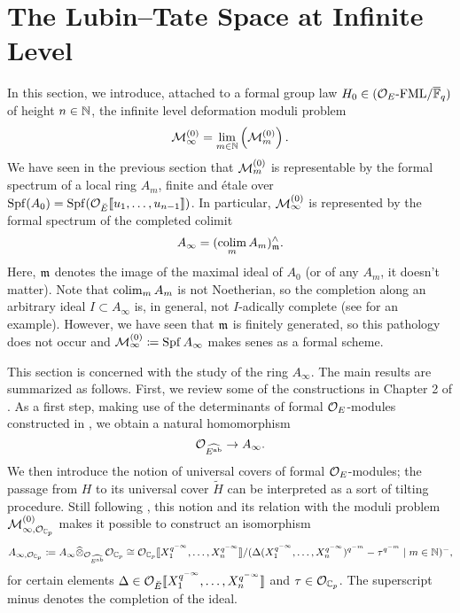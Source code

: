 \documentclass[../main.tex]{subfiles}
\begin{document}
\section{The Lubin--Tate Space at Infinite Level}
In this section, we introduce, attached to a formal group law
$H_0 \in {({\mathcal{O}_E}\text-\allowbreak\mathrm{FML}/{{\overline{\mathbb{F}}_q}})}$ of height $n \in \mathbb{N}$, the infinite level
deformation moduli problem
\begin{equation*}
  \mathcal{M}_{\infty}^{(0)} = \lim_{m \in \mathbb{N}} \left(\mathcal{M}_{m}^{(0)}\right).
\end{equation*}
We have seen in the previous section that $\mathcal{M}_{m}^{(0)}$ is 
representable by the formal spectrum of a local ring $A_m$, finite and \'etale
over $\operatorname{Spf}(A_0) = \operatorname{Spf}(\mathcal{O}_{{\breve {E}}}\llbracket u_1, \dots, u_{n-1}\rrbracket)$. In particular,
$\mathcal{M}_{\infty}^{(0)}$ is represented by 
the formal spectrum of the completed colimit 
\begin{equation*}
  A_\infty = (\operatorname*{colim}_m A_m)^\wedge_{\mathfrak{m}}.
\end{equation*}
Here, $\mathfrak{m}$ denotes the image of the maximal ideal of $A_0$ (or of any $A_m$, it doesn't
matter). Note that $\operatorname*{colim}_m A_m$ is not Noetherian, so the completion 
along an arbitrary ideal $I \subset A_\infty$ is, in general, not $I$-adically
complete (see \cite[\href{https://stacks.math.columbia.edu/tag/05JA}{Tag
05JA}]{stacks-project} for an example). However, we have seen that $\mathfrak{m}$ is
finitely generated, so this pathology does not occur and $\mathcal{M}_\infty^{(0)}
\coloneqq \operatorname{Spf} A_\infty$ makes senes as a formal scheme.

This section is concerned with the study of the ring $A_\infty$. 
The main results are summarized as follows. 
First, we review some of the constructions in Chapter 2 of
\cite{weinstein2016semistable}. As a first step, making use of the determinants
of formal $\mathcal{O}_E$-modules constructed in \cite{hedayatzadeh2015det}, we obtain
a natural homomorphism
\begin{equation*}
   \mathcal{O}_{\widehat{E^{\mathrm{ab}}}} \to  A_\infty.
\end{equation*}
We then introduce the notion of universal covers of formal $\mathcal{O}_E$-modules; the 
passage from $H$ to its universal cover $\tilde H$ can be interpreted as a sort
of tilting procedure. Still following \cite{weinstein2016semistable}, this
notion and its relation with the moduli problem $\mathcal{M}_{\infty,
\mathcal{O}_{\mathbb{C}_p}}^{(0)}$ makes it possible to construct an isomorphism
\begin{equation}\label{eq:ExplicitAinftyBCtoOC}
  A_{\infty, \mathcal{O}_{\mathbb{C}_p}} \coloneq A_\infty \widehat \otimes_{\mathcal{O}_{\widehat{E^{\mathrm{ab}}}}}
  \mathcal{O}_{\mathbb{C}_p} 
  \cong \mathcal{O}_{\mathbb{C}_p} \llbracket X_1^{q^{-\infty}}, \dots, X_n^{q^{-\infty}} \rrbracket /
  (\Delta(X_1^{q^{-\infty}}, \dots, X_n^{q^{-\infty}})^{q^{-m}} - \tau^{q^{-m}} \mid 
  m \in \mathbb{N})^- ,
\end{equation}
for certain elements $\Delta \in \mathcal{O}_{{\breve {E}}} \llbracket X_1^{q^{-\infty}}, \dots,
X_n^{q^{-\infty}}\rrbracket$ and $\tau \in \mathcal{O}_{\mathbb{C}_p}$. The superscript minus denotes
the completion of the ideal.
\end{document}
